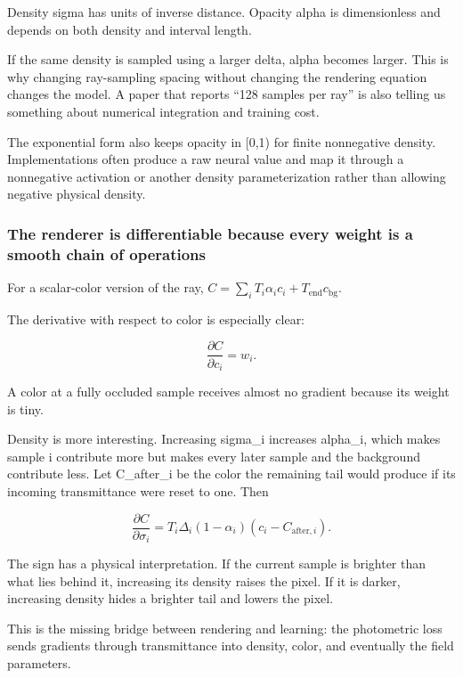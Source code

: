 Density sigma has units of inverse distance. Opacity alpha is dimensionless and depends on both density and interval length.

If the same density is sampled using a larger delta, alpha becomes larger. This is why changing ray-sampling spacing without changing the rendering equation changes the model. A paper that reports ``128 samples per ray'' is also telling us something about numerical integration and training cost.

The exponential form also keeps opacity in {[}0,1) for finite nonnegative density. Implementations often produce a raw neural value and map it through a nonnegative activation or another density parameterization rather than allowing negative physical density.

\subsubsection{The renderer is differentiable because every weight is a smooth chain of operations}\label{04-visual-computing-ii-ch035-the-renderer-is-differentiable-because-every-weight-is-a-smooth-chain-of-operations}

\hypertarget{04-visual-computing-ii-ch035-the-renderer-is-differentiable-because-every-weight-is-a-smooth-chain-of-operations}{}

For a scalar-color version of the ray, \(C=\sum_iT_i\alpha_ic_i+T_{\mathrm{end}}c_{\mathrm{bg}}\).

The derivative with respect to color is especially clear:

\[\frac{\partial C}{\partial c_i}=w_i.\]

A color at a fully occluded sample receives almost no gradient because its weight is tiny.

Density is more interesting. Increasing sigma\_i increases alpha\_i, which makes sample i contribute more but makes every later sample and the background contribute less. Let C\_after\_i be the color the remaining tail would produce if its incoming transmittance were reset to one. Then

\[\frac{\partial C}{\partial\sigma_i}=T_i\Delta_i(1-\alpha_i)(c_i-C_{\mathrm{after},i}).\]

The sign has a physical interpretation. If the current sample is brighter than what lies behind it, increasing its density raises the pixel. If it is darker, increasing density hides a brighter tail and lowers the pixel.

This is the missing bridge between rendering and learning: the photometric loss sends gradients through transmittance into density, color, and eventually the field parameters.

